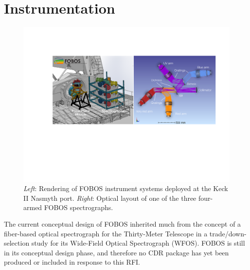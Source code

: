 \documentclass[oneside,11pt]{amsart}
\begin{document}
\section{Instrumentation}
\label{sec:inst}

\begin{figure}[h!]
\vskip -0.1in
\includegraphics[width=\textwidth]{FOBOS_inst_2019-10-28.pdf}
\caption{\small {\it Left}: Rendering of FOBOS instrument systems
deployed at the Keck II Nasmyth port. {\it Right}: Optical layout of
one of the three four-armed FOBOS spectrographs.}
\label{fig:layout}
\end{figure}



The current conceptual design of FOBOS inherited much from the
concept of a fiber-based optical spectrograph for the Thirty-Meter
Telescope in a trade/down-selection study for its Wide-Field Optical
Spectrograph (WFOS). FOBOS is still in its conceptual design phase,
and therefore no CDR package has yet been produced or included in
response to this RFI.
\end{document}
